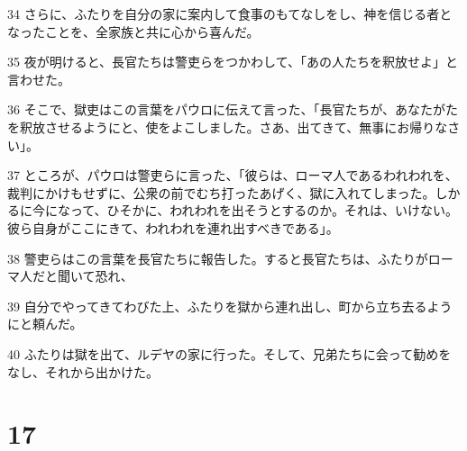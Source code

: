 \par 34 さらに、ふたりを自分の家に案内して食事のもてなしをし、神を信じる者となったことを、全家族と共に心から喜んだ。
\par 35 夜が明けると、長官たちは警吏らをつかわして、「あの人たちを釈放せよ」と言わせた。
\par 36 そこで、獄吏はこの言葉をパウロに伝えて言った、「長官たちが、あなたがたを釈放させるようにと、使をよこしました。さあ、出てきて、無事にお帰りなさい」。
\par 37 ところが、パウロは警吏らに言った、「彼らは、ローマ人であるわれわれを、裁判にかけもせずに、公衆の前でむち打ったあげく、獄に入れてしまった。しかるに今になって、ひそかに、われわれを出そうとするのか。それは、いけない。彼ら自身がここにきて、われわれを連れ出すべきである」。
\par 38 警吏らはこの言葉を長官たちに報告した。すると長官たちは、ふたりがローマ人だと聞いて恐れ、
\par 39 自分でやってきてわびた上、ふたりを獄から連れ出し、町から立ち去るようにと頼んだ。
\par 40 ふたりは獄を出て、ルデヤの家に行った。そして、兄弟たちに会って勧めをなし、それから出かけた。

\chapter{17}

